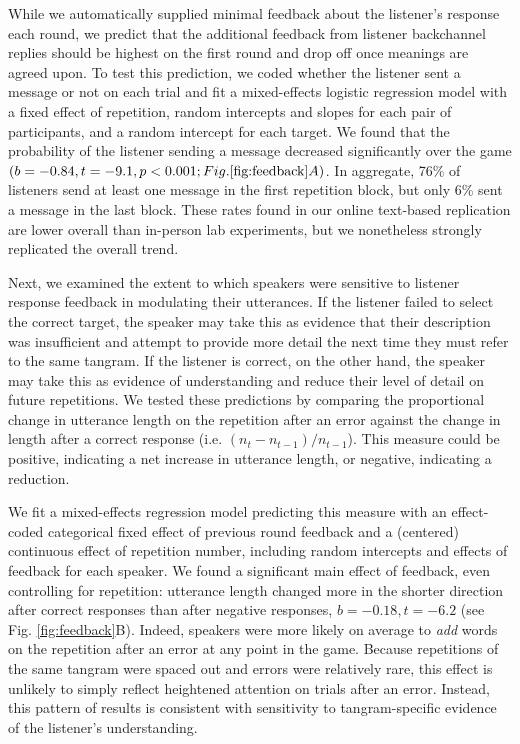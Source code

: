 While we automatically supplied minimal feedback about the listener's response each round, we predict that the additional feedback from listener backchannel replies should be highest on the first round and drop off once meanings are agreed upon. 
To test this prediction, we coded whether the listener sent a message or not on each trial and fit a mixed-effects logistic regression model with a fixed effect of repetition, random intercepts and slopes for each pair of participants, and a random intercept for each target. 
We found that the probability of the listener sending a message decreased significantly over the game $(b=-0.84, t = -9.1, p < 0.001; Fig. \ref{fig:feedback}A)$.
In aggregate, 76\% of listeners send at least one message in the first repetition block, but only 6\% sent a message in the last block.
These rates found in our online text-based replication are lower overall than in-person lab experiments, but we nonetheless strongly replicated the overall trend.

Next, we examined the extent to which speakers were sensitive to listener response feedback in modulating their utterances.
If the listener failed to select the correct target, the speaker may take this as evidence that their description was insufficient and attempt to provide more detail the next time they must refer to the same tangram. 
If the listener is correct, on the other hand, the speaker may take this as evidence of understanding and reduce their level of detail on future repetitions.
We tested these predictions by comparing the proportional change in utterance length on the repetition after an error against the change in length after a correct response (i.e. $(n_t - n_{t-1})/n_{t-1}$).
This measure could be positive, indicating a net increase in utterance length, or negative, indicating a reduction.

We fit a mixed-effects regression model predicting this measure with an effect-coded categorical fixed effect of previous round feedback and a (centered) continuous effect of repetition number, including random intercepts and effects of feedback for each speaker.
We found a significant main effect of feedback, even controlling for repetition: utterance length changed more in the shorter direction after correct responses than after negative responses, $b = -0.18, t = -6.2$ (see Fig. \ref{fig:feedback}B).
Indeed, speakers were more likely on average to \emph{add} words on the repetition after an error at any point in the game.
Because repetitions of the same tangram were spaced out and errors were relatively rare, this effect is unlikely to simply reflect heightened attention on trials after an error.
Instead, this pattern of results is consistent with sensitivity to tangram-specific evidence of the listener's understanding.

